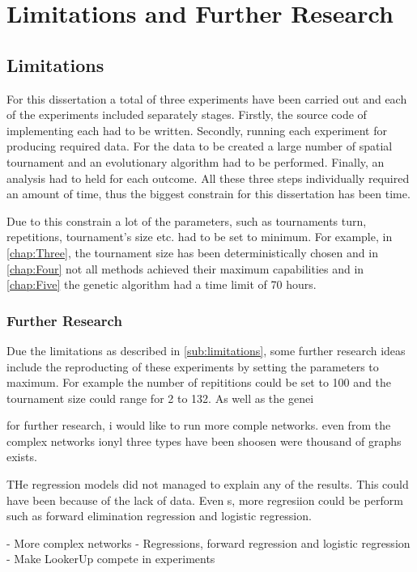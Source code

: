 \section{Limitations and Further Research}
\subsection{Limitations}
\label{sub:limitations}
For this dissertation a total of three experiments have been carried out and
each of the experiments included separately stages. Firstly, the source code of implementing
each had to be written. Secondly, running each experiment for producing required data.
For the data to be created a large number of spatial
tournament and an evolutionary algorithm had to be performed. Finally, an
analysis had to held for each outcome. All these three steps individually required
an amount of time, thus the biggest constrain for this dissertation has been time.

Due to this constrain a lot of the parameters, such as tournaments turn, repetitions,
tournament's size etc. had to be set to minimum. For example, in \autoref{chap:Three},
the tournament size has been deterministically chosen and in \autoref{chap:Four}
not all methods achieved their maximum capabilities and in \autoref{chap:Five} the
genetic algorithm had a time limit of 70 hours.

\subsubsection{Further Research}

Due the limitations as described in \autoref{sub:limitations}, some further
research ideas include the reproducting of these experiments by setting the
parameters to maximum. For example the number of repititions could be set to 100
and the tournament size could range for 2 to 132. As well as the genei



for further research, i would like to run more comple networks. even from the complex
networks ionyl three types have been shoosen were thousand of graphs exists.

THe regression models did not managed to explain any of the results. This could have been
because of the lack of data. Even s, more regresiion could be perform such as
forward elimination regression and logistic regression.

- More complex networks
- Regressions, forward regression and logistic regression
- Make LookerUp compete in experiments
